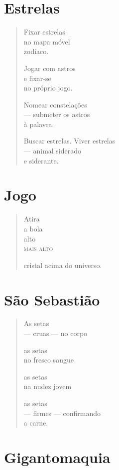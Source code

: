 \chapter{Estrelas}

\begin{verse}
Fixar estrelas\\
no mapa móvel\\
zodíaco.

Jogar com astros\\
e fixar-se\\
no próprio jogo.

Nomear constelações\\
---  submeter os astros\\
à palavra.

Buscar estrelas. Viver estrelas\\
\hfill --- animal siderado\\
\hfill e siderante.
\end{verse}

\chapter{Jogo}

\begin{verse}
Atira\\
a bola\\
alto\\
\textsc{mais alto}

cristal acima do universo.
\end{verse}

\chapter{São Sebastião}

\begin{verse}
As setas\\
--- cruas --- no corpo

as setas\\
no fresco sangue

as setas\\
na nudez jovem

as setas\\
--- firmes --- confirmando\\
\hfill a carne.
\end{verse}

\chapter{Gigantomaquia}

